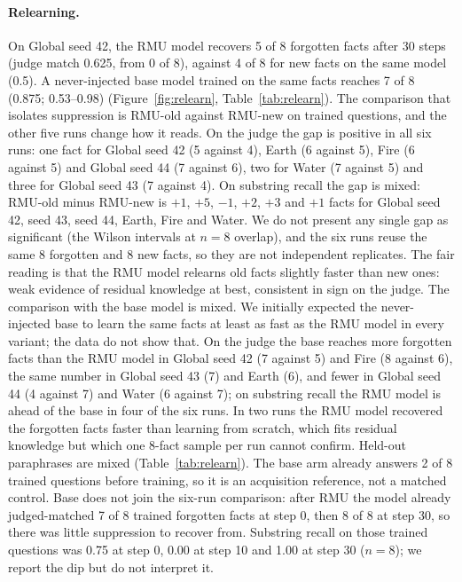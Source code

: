 \documentclass[10pt,twocolumn]{article}
\begin{document}
\paragraph{Relearning.} On Global seed 42, the RMU model recovers 5 of 8 forgotten facts after 30 steps (judge match 0.625, from 0 of 8), against 4 of 8 for new facts on the same model (0.5). A never-injected base model trained on the same facts reaches 7 of 8 (0.875; 0.53--0.98) (Figure~\ref{fig:relearn}, Table~\ref{tab:relearn}). The comparison that isolates suppression is RMU-old against RMU-new on trained questions, and the other five runs change how it reads. On the judge the gap is positive in all six runs: one fact for Global seed 42 (5 against 4), Earth (6 against 5), Fire (6 against 5) and Global seed 44 (7 against 6), two for Water (7 against 5) and three for Global seed 43 (7 against 4). On substring recall the gap is mixed: RMU-old minus RMU-new is $+1$, $+5$, $-1$, $+2$, $+3$ and $+1$ facts for Global seed 42, seed 43, seed 44, Earth, Fire and Water. We do not present any single gap as significant (the Wilson intervals at $n=8$ overlap), and the six runs reuse the same 8 forgotten and 8 new facts, so they are not independent replicates. The fair reading is that the RMU model relearns old facts slightly faster than new ones: weak evidence of residual knowledge at best, consistent in sign on the judge. The comparison with the base model is mixed. We initially expected the never-injected base to learn the same facts at least as fast as the RMU model in every variant; the data do not show that. On the judge the base reaches more forgotten facts than the RMU model in Global seed 42 (7 against 5) and Fire (8 against 6), the same number in Global seed 43 (7) and Earth (6), and fewer in Global seed 44 (4 against 7) and Water (6 against 7); on substring recall the RMU model is ahead of the base in four of the six runs. In two runs the RMU model recovered the forgotten facts faster than learning from scratch, which fits residual knowledge but which one 8-fact sample per run cannot confirm. Held-out paraphrases are mixed (Table~\ref{tab:relearn}). The base arm already answers 2 of 8 trained questions before training, so it is an acquisition reference, not a matched control. Base does not join the six-run comparison: after RMU the model already judged-matched 7 of 8 trained forgotten facts at step 0, then 8 of 8 at step 30, so there was little suppression to recover from. Substring recall on those trained questions was 0.75 at step 0, 0.00 at step 10 and 1.00 at step 30 ($n=8$); we report the dip but do not interpret it.
\end{document}

